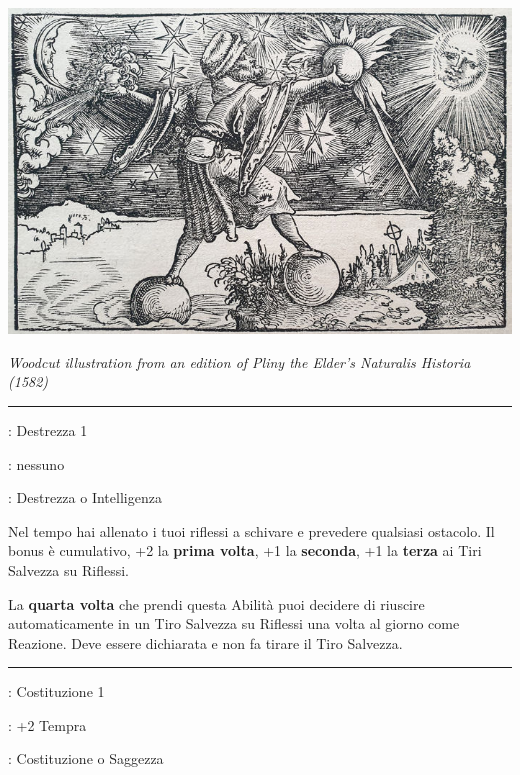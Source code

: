 \begin{multicols}{2}
\begin{center}
	\includegraphics[width=0.9\linewidth]{immagini/Historia_Mundi_Naturalis.png}

	\emph{Woodcut illustration from an edition of Pliny the Elder's Naturalis Historia (1582)}
\end{center}

\smallskip\noindent\rule{\linewidth}{2pt} \hypertarget{Riflessi fulminei}{}\medskip{}
\noindent
\begin{description}[noitemsep, topsep=0pt, parsep=0pt, partopsep=0pt, leftmargin=0cm, labelwidth=2.5cm]
    \item[\textbf{Requisito}]: Destrezza 1
    \item[\textbf{Tiri Salvezza}]: nessuno
    \item[\textbf{Caratteristica}]: Destrezza o Intelligenza
\end{description}

Nel tempo hai allenato i tuoi riflessi a schivare e prevedere qualsiasi ostacolo. Il bonus è cumulativo, +2 la \textbf{prima volta}, +1 la \textbf{seconda}, +1 la \textbf{terza} ai Tiri Salvezza su Riflessi.

La \textbf{quarta volta} che prendi questa Abilità puoi decidere di riuscire automaticamente in un Tiro Salvezza su Riflessi una volta al giorno come Reazione. Deve essere dichiarata e non fa tirare il Tiro Salvezza.

\smallskip\noindent\rule{\linewidth}{2pt} \hypertarget{abRinoceronte}{}\medskip{}\label{Rinoceronte}
\noindent
\begin{description}[noitemsep, topsep=0pt, parsep=0pt, partopsep=0pt, leftmargin=0cm, labelwidth=2.5cm]
    \item[\textbf{Requisito}]: Costituzione 1
    \item[\textbf{Tiri Salvezza}]: +2 Tempra
    \item[\textbf{Caratteristica}]: Costituzione o Saggezza
\end{description}


\end{multicols}
